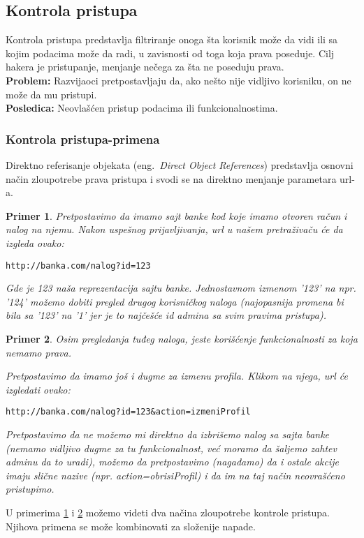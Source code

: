 \documentclass[a4paper]{article}
\newtheorem{primer}{Primer}[section]
\begin{document}
\subsection{Kontrola pristupa}

Kontrola pristupa predstavlja filtriranje onoga šta korisnik može da vidi ili sa kojim podacima može da radi,  u zavisnosti od toga koja prava poseduje. Cilj hakera je pristupanje, menjanje nečega za šta ne poseduju prava.\\
\textbf{Problem:} Razvijaoci pretpostavljaju da, ako nešto nije vidljivo korisniku, on ne može da mu pristupi.\\
\textbf{Posledica:} Neovlašćen pristup podacima ili funkcionalnostima.

\subsubsection{Kontrola pristupa-primena}

Direktno referisanje objekata (eng.~{\em Direct Object References}) predstavlja osnovni način zloupotrebe prava pristupa i svodi se na direktno menjanje parametara url-a.
\begin{primer}
\label{primer3}
Pretpostavimo da imamo sajt banke kod koje imamo otvoren račun i nalog na njemu. Nakon uspešnog prijavljivanja, url u našem pretraživaču će da izgleda ovako:
\begin{lstlisting}
http://banka.com/nalog?id=123
\end{lstlisting}
Gde je 123 naša reprezentacija sajtu banke. Jednostavnom izmenom '123' na npr. '124' možemo dobiti pregled drugog korisničkog naloga (najopasnija promena bi bila sa '123' na '1' jer je to najčešće id admina sa svim pravima pristupa).
\end{primer}
\begin{primer}
\label{primer4}
Osim pregledanja tuđeg naloga, jeste korišćenje funkcionalnosti za koja nemamo prava.

Pretpostavimo da imamo još i dugme za izmenu profila. Klikom na njega, url će izgledati ovako:\\

\begin{lstlisting}
http://banka.com/nalog?id=123&action=izmeniProfil
\end{lstlisting}

Pretpostavimo da ne možemo mi direktno da izbrišemo nalog sa sajta banke (nemamo vidljivo dugme za tu funkcionalnost, već moramo da šaljemo zahtev adminu da to uradi), možemo da pretpostavimo (nagađamo) da i ostale akcije imaju slične nazive (npr. action=obrisiProfil) i da im na taj način neovrašćeno pristupimo.\\
\end{primer}
U primerima \ref{primer3} i \ref{primer4} možemo videti dva načina zloupotrebe kontrole pristupa. Njihova primena se može kombinovati za složenije napade.
\end{document}
